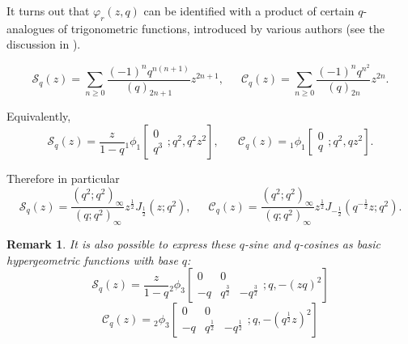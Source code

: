 \documentclass[11pt]{amsart}
\newtheorem{rmk}[thm]{Remark}
\newcommand{\qsin}{\mathcal{S}_q}
\newcommand{\qcos}{\mathcal{C}_q}
\begin{document}
It turns out that $\varphi_r\left(z,q\right)$ can be identified with a product of certain $q$-analogues of trigonometric functions, introduced by various authors (see the discussion in \cite[Sec.~2]{Nevanlinna}).

\begin{equation}\label{eqn:def_q_trigonometric}
\qsin \left(z\right) = \sum_{n\ge 0} \frac{\left(-1\right)^n q^{n\left(n+1\right)}}{\left(q\right)_{2n+1}} z^{2n+1}, \,\,\,\,\,\,\,\,\, \qcos \left(z\right) = \sum_{n\ge 0} \frac{\left(-1\right)^n q^{n^2}}{\left(q\right)_{2n}} z^{2n}.
\end{equation}


Equivalently,
\begin{equation}\label{eqn:trigonometric_as_hypergeometric}
\qsin\left(z\right) = \frac{z}{1-q} {_1\phi_1} \left[ \begin{matrix} 0\\ q^3 \end{matrix}; q^2,q^2 z^2 \right],\,\,\,\,\,\,\,\,\,\, \qcos\left(z\right) =  {_1\phi_1} \left[ \begin{matrix} 0\\ q \end{matrix}; q^2,q z^2\right].
\end{equation}

Therefore in particular
$$\qsin \left(z\right) = \frac{\left(q^2;q^2\right)_\infty }{\left(q;q^2\right)_\infty} z^{\frac12} J_{\frac12} \left(z;q^2\right),\,\,\,\,\,\,\,\,\, \qcos \left(z\right) = \frac{\left(q^2;q^2\right)_\infty }{\left(q;q^2\right)_\infty} z^{\frac12} J_{-\frac12} \left(q^{-\frac12}z;q^2\right).$$


\begin{rmk}
It is also possible to express these $q$-sine and $q$-cosines as basic hypergeometric functions with base $q$:
$$\qsin \left(z\right) = \frac{z}{1-q} {_2\phi_3} \left[ \begin{matrix} 0 &0\\ -q & q^{\frac32} & -q^{\frac32} \end{matrix}; q, -\left(z q\right)^2\right]$$
$$\qcos \left(z\right) = {_2\phi_3} \left[ \begin{matrix} 0 &0\\-q  & q^{\frac12} & -q^{\frac12} \end{matrix}; q,-\left(q^{\frac12} z\right)^2\right]$$
\end{rmk}
\end{document}
